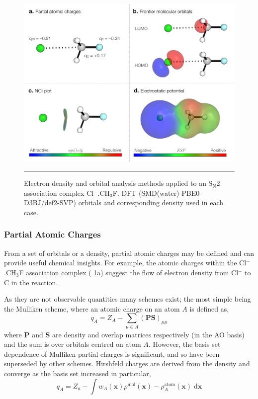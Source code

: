 \documentclass[main.tex]{subfiles}
\begin{document}
\begin{figure}[h!]
	\centering
	\includegraphics[width=\textwidth]{2/figs/fig2/analysis.pdf}
	\vspace{0.1cm}
	\hrule
	\caption{Electron density and orbital analysis methods applied to an S$_\text{N}$2 association complex Cl${}^{-}$.CH${}_3$F. DFT (SMD(water)-PBE0-D3BJ/def2-SVP) orbitals and corresponding density used in each case.}
	\label{fig::intro_analysis_methods}
\end{figure}


\subsubsection{Partial Atomic Charges}

From a set of orbitals or a density, partial atomic charges may be defined and can provide useful chemical insights. For example, the atomic charges within the Cl${}^{-}$.CH${}_3$F association complex (\figurename{ \ref{fig::intro_analysis_methods}a}) suggest the flow of electron density from Cl$^{-}$ to C in the reaction.

As they are not observable quantities many schemes exist; the most simple being the Mulliken scheme, where an atomic charge on an atom $A$ is defined as,\cite{SzaboIntro}
\begin{equation}
	q_A = Z_A - \sum_{\mu \in A} (\boldsymbol{P}\boldsymbol{S})_{\mu \mu}
\end{equation}
where $\boldsymbol{P}$ and $\boldsymbol{S}$ are density and overlap matrices respectively (in the AO basis) and the sum is over orbitals centred on atom $A$. However, the basis set dependence of Mulliken partial charges is significant,\cite{Cusachs1968} and so have been superseded by other schemes. Hirshfeld charges are derived from the density and converge as the basis set increased in particular,\cite{Hirshfeld1977}
\begin{equation}
	q_A = Z_a - \int w_A(\boldsymbol{x}) \rho^\text{mol}(\boldsymbol{x}) - \rho^\text{atom}_A(\boldsymbol{x}) \;\text{d}\boldsymbol{x}
\end{equation}
\end{document}
